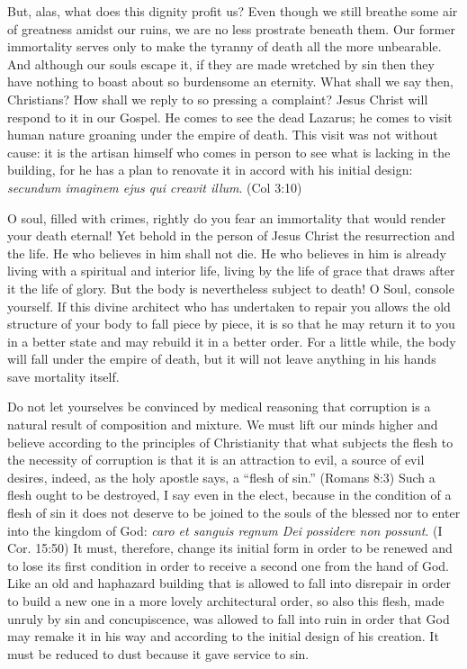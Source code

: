 \documentclass[10pt, twoside]{article}
\begin{document}
But, alas, what does this dignity profit us? Even though we still breathe some air of greatness amidst our ruins, we are no less prostrate beneath them. Our former immortality serves only to make the tyranny of death all the more unbearable. And although our souls escape it, if they are made wretched by sin then they have nothing to boast about so burdensome an eternity. What shall we say then, Christians? How shall we reply to so pressing a complaint? Jesus Christ will respond to it in our Gospel. He comes to see the dead Lazarus; he comes to visit human nature groaning under the empire of death. This visit was not without cause: it is the artisan himself who comes in person to see what is lacking in the building, for he has a plan to renovate it in accord with his initial design: \textit{secundum imaginem ejus qui creavit illum}. (Col 3:10)

O soul, filled with crimes, rightly do you fear an immortality that would render your death eternal! Yet behold in the person of Jesus Christ the resurrection and the life. He who believes in him shall not die. He who believes in him is already living with a spiritual and interior life, living by the life of grace that draws after it the life of glory. But the body is nevertheless subject to death! O Soul, console yourself. If this divine architect who has undertaken to repair you allows the old structure of your body to fall piece by piece, it is so that he may return it to you in a better state and may rebuild it in a better order. For a little while, the body will fall under the empire of death, but it will not leave anything in his hands save mortality itself.

Do not let yourselves be convinced by medical reasoning that corruption is a natural result of composition and mixture. We must lift our minds higher and believe according to the principles of Christianity that what subjects the flesh to the necessity of corruption is that it is an attraction to evil, a source of evil desires, indeed, as the holy apostle says, a ``flesh of sin.'' (Romans 8:3) Such a flesh ought to be destroyed, I say even in the elect, because in the condition of a flesh of sin it does not deserve to be joined to the souls of the blessed nor to enter into the kingdom of God: \textit{caro et sanguis regnum Dei possidere non possunt}. (I Cor. 15:50) It must, therefore, change its initial form in order to be renewed and to lose its first condition in order to receive a second one from the hand of God. Like an old and haphazard building that is allowed to fall into disrepair in order to build a new one in a more lovely architectural order, so also this flesh, made unruly by sin and concupiscence, was allowed to fall into ruin in order that God may remake it in his way and according to the initial design of his creation. It must be reduced to dust because it gave service to sin.
\end{document}
